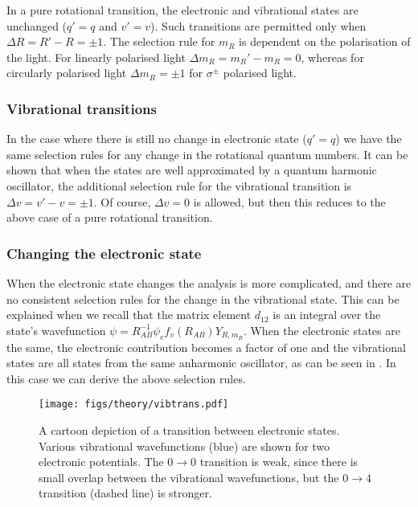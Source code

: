In a pure rotational transition, the electronic and vibrational states are
unchanged ($q'=q$ and $v'=v$). Such transitions are permitted only when $\Delta
R = R' - R = \pm1$. The selection rule for $m_R$ is dependent on the
polarisation of the light. For linearly polarised light $\Delta m_R = m_R' -
m_R = 0$, whereas for circularly polarised light $\Delta m_R =  \pm1$ for
$\sigma^\pm$ polarised light.

\subsubsection{Vibrational transitions}

In the case where there is still no change in electronic state ($q'=q$) we have
the same selection rules for any change in the rotational quantum numbers. It
can be shown that when the states are well approximated by a quantum harmonic
oscillator, the additional selection rule for the vibrational transition
is $\Delta v = v' - v = \pm 1$. Of course, $\Delta v = 0$ is allowed, but then
this reduces to the above case of a pure rotational transition.

\subsubsection{Changing the electronic state}

When the electronic state changes the analysis is more complicated, and there
are no consistent selection rules for the change in the vibrational state. This
can be explained when we recall that the matrix element $d_{12}$ is an integral
over the state's wavefunction $\psi = R_{AB}^{-1}\psi_ef_v(R_{AB}) Y_{R, m_R}$.
When the electronic states are the same, the electronic contribution becomes a
factor of one and the vibrational states are all states from the same
anharmonic oscillator, as can be seen in . In
this case we can derive the above selection rules.

\begin{figure}
  \centering
  \texttt{[image: figs/theory/vibtrans.pdf]}
  \caption{
    A cartoon depiction of a transition between electronic states. Various
    vibrational wavefunctions (blue) are shown for two electronic potentials.
    The $0\rightarrow0$ transition is weak, since there is small overlap
    between the vibrational wavefunctions, but the $0\rightarrow4$ transition
    (dashed line) is stronger.
  }
  \label{theory:fig:vibtrans}
\end{figure}

